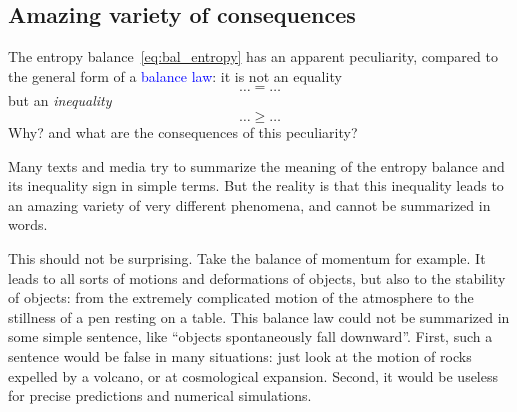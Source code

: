\documentclass[a4paper,12pt,%
onecolumn,oneside,titlepage,%
british%
]{memoir}
\renewcommand*{\|}[1][]{\nonscript\:#1\vert\nonscript\:\mathopen{}}
\newcommand*{\sect}{\S}%
\renewcommand*{\autoref}[2]{\sidepar{\vspace{-1ex}\footnotesize{\color{blue}\faIcon{%
reply%
}\enspace\sect\,\ref{#1} page\,\pageref{#1}}}\textcolor{blue}{#2}}
\begin{document}
\subsection{Amazing variety of consequences}
\label{sec:amazing_variety_entropy}

The entropy balance~\eqref{eq:bal_entropy} has an apparent peculiarity, compared to the general form of a \autoref{sec:balance_laws}{balance law}: it is not an equality
$$\dotso=\dotso$$
but an \emph{inequality}
$$\dotso\ge\dotso$$
Why? and what are the consequences of this peculiarity?

\smallskip

Many texts and media try to summarize the meaning of the entropy balance and its inequality sign in simple terms. But the reality is that this inequality leads to an amazing variety of very different phenomena, and cannot be summarized in words.

This should not be surprising. Take the %
balance of momentum for example. It leads to all sorts of motions and deformations of objects, but also to the stability of objects: from the extremely complicated motion of the atmosphere to the stillness of a pen resting on a table. This balance law could not be summarized in some simple sentence, like \enquote{objects spontaneously fall downward}. First, such a sentence would be false in many situations: just look at the motion of rocks expelled by a volcano, or at cosmological expansion. Second, it would be useless for precise predictions and numerical simulations.
\end{document}
